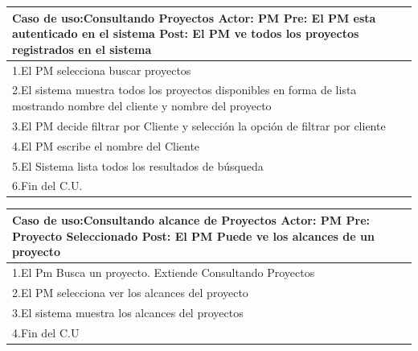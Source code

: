 
\begin{longtable}{|p{}|p{}|}
    \hline
    \multicolumn{2}{|p{16cm}|}{
        \textbf{Caso de uso:}Consultando Proyectos\newline
        \textbf{Actor:} PM\newline
        \textbf{Pre: }El PM esta autenticado en el sistema\newline
        \textbf{Post:} El PM ve todos los proyectos registrados en el sistema
    }\\
    \hline
    1.El PM selecciona buscar proyectos& \\
    \hline
    2.El sistema muestra todos los proyectos disponibles en forma de lista mostrando nombre del cliente y nombre del proyecto &\\
    \hline
    3.El PM decide filtrar por Cliente y selección la opción de filtrar por cliente& \\
    \hline
    4.El PM escribe el nombre del Cliente& \\
    \hline
    5.El Sistema lista todos los resultados de búsqueda&\\
    \hline
    6.Fin del C.U.&\\
    \hline
\end{longtable}

\begin{longtable}{|p{}|p{}|}
    \hline
    \multicolumn{2}{|p{16cm}|}{
        \textbf{Caso de uso:}Consultando alcance de Proyectos\newline
        \textbf{Actor:} PM\newline
        \textbf{Pre: }Proyecto Seleccionado\newline
        \textbf{Post:} El PM Puede ve los alcances de un proyecto
    }\\
    \hline
    1.El Pm Busca un proyecto. Extiende Consultando Proyectos& \\
    \hline
    2.El PM selecciona ver los alcances del proyecto&  \\
    \hline
    3.El sistema muestra los alcances del proyectos& \\
    \hline
    4.Fin del C.U&\\
    \hline
\end{longtable}

